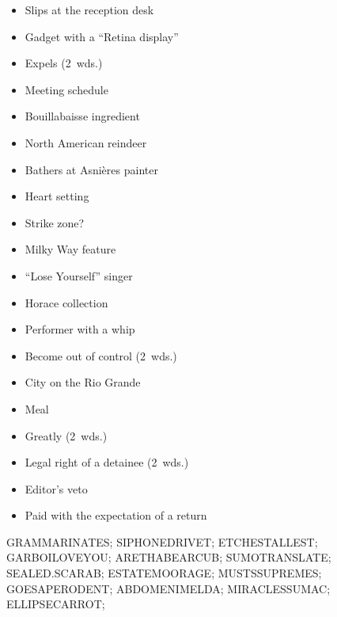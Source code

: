 {\begin{itemize}
      \item
        Slips at the reception desk
    \end{itemize}
  \item
    \begin{itemize}
      \item
        Gadget with a ``Retina display''
      \item
        Expels (2~wds.)
      \item
        Meeting schedule
      \item
        Bouillabaisse ingredient
      \item
        North American reindeer
      \item
        Bathers at Asni\`{e}res painter
    \end{itemize}
  \item
    \begin{itemize}
      \item
        Heart setting
      \item
        Strike zone?
      \item
        Milky Way feature
      \item
        ``Lose Yourself'' singer
      \item
        Horace collection
      \item
        Performer with a whip
    \end{itemize}
  \item
    \begin{itemize}
      \item
        Become out of control (2~wds.)
      \item
        City on the Rio Grande
      \item
        Meal
      \item
        Greatly (2~wds.)
    \end{itemize}
  \item
    \begin{itemize}
      \item
        Legal right of a detainee (2~wds.)
      \item
        Editor's veto
    \end{itemize}
  \item
    \begin{itemize}
      \item
        Paid with the expectation of a return
    \end{itemize}
}{%
  \puzzlerow GRAMMARINATES;
  \puzzlerow SIPHONEDRIVET;
  \puzzlerow ETCHESTALLEST;
  \puzzlerow GARBOILOVEYOU;
  \puzzlerow ARETHABEARCUB;
  \puzzlerow SUMOTRANSLATE;
  \puzzlerow SEALED.SCARAB;
  \puzzlerow ESTATEMOORAGE;
  \puzzlerow MUSTSSUPREMES;
  \puzzlerow GOESAPERODENT;
  \puzzlerow ABDOMENIMELDA;
  \puzzlerow MIRACLESSUMAC;
  \puzzlerow ELLIPSECARROT;
}
